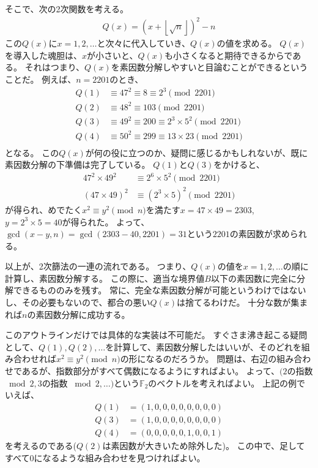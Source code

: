 そこで、次の2次関数を考える。
\begin{align*}
Q(x) = (x + \left \lfloor\sqrt{n}\right \rfloor)^2 - n
\end{align*}
この$Q(x)$に$x=1,2,\ldots$と次々に代入していき、$Q(x)$の値を求める。
$Q(x)$を導入した魂胆は、$x$が小さいと、$Q(x)$も小さくなると期待できるからである。
それはつまり、$Q(x)$を素因数分解しやすいと目論むことができるということだ。
例えば、$n=2201$のとき、
\begin{align*}
Q(1) &\equiv 47^2 \equiv 8 \equiv 2^3\pmod{2201}\\
Q(2) &\equiv 48^2 \equiv 103 \pmod{2201}\\
Q(3) &\equiv 49^2 \equiv 200 \equiv 2^3 \times 5^2 \pmod{2201}\\
Q(4) &\equiv 50^2 \equiv 299 \equiv 13 \times 23 \pmod{2201}\\
\end{align*}
となる。
この$Q(x)$が何の役に立つのか、疑問に感じるかもしれないが、既に素因数分解の下準備は完了している。
$Q(1)$と$Q(3)$をかけると、
\begin{align*}
47^2 \times 49^2 &\equiv 2^6 \times 5^2 \pmod{2201}\\
(47 \times 49)^2 &\equiv (2^3 \times 5)^2 \pmod{2201}
\end{align*}
が得られ、めでたく$x^2\equiv y^2\pmod{n}$を満たす$x=47\times49=2303$, $y=2^3\times5=40$が得られた。
よって、$\gcd(x-y,n) = \gcd(2303-40, 2201) = 31$という$2201$の素因数が求められる。

以上が、2次篩法の一連の流れである。
つまり、$Q(x)$の値を$x=1,2,\ldots$の順に計算し、素因数分解する。
この際に、適当な境界値$B$以下の素因数に完全に分解できるもののみを残す。
常に、完全な素因数分解が可能というわけではないし、その必要もないので、都合の悪い$Q(x)$は捨てるわけだ。
十分な数が集まれば$n$の素因数分解に成功する。

このアウトラインだけでは具体的な実装は不可能だ。
すぐさま沸き起こる疑問として、$Q(1), Q(2),\ldots$を計算して、素因数分解したはいいが、そのどれを組み合わせれば$x^2\equiv y^2 \pmod{n}$の形になるのだろうか。
問題は、右辺の組み合わせであるが、指数部分がすべて偶数になるようにすればよい。
よって、$(2$の指数$\bmod{2}, 3$の指数 $\bmod{2}, \ldots)$という$\mathbb{F}_2$のベクトルを考えればよい。
上記の例でいえば、
\begin{align*}
Q(1) &= (1, 0, 0, 0, 0, 0, 0, 0, 0)\\
Q(3) &= (1, 0, 0, 0, 0, 0, 0, 0, 0)\\
Q(4) &= (0, 0, 0, 0, 0, 1, 0, 0, 1)
\end{align*}
を考えるのである($Q(2)$は素因数が大きいため除外した)。
この中で、足してすべて$0$になるような組み合わせを見つければよい。


